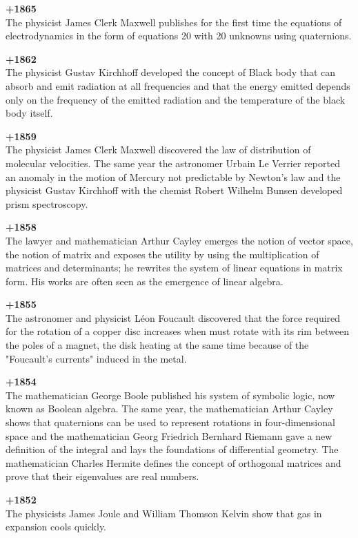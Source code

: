 \textbf{+1865}\\
The physicist James Clerk Maxwell publishes for the first time the equations of electrodynamics in the form of equations 20 with 20 unknowns using quaternions. 

\textbf{+1862}\\
The physicist Gustav Kirchhoff developed the concept of Black body that can absorb and emit radiation at all frequencies and that the energy emitted depends only on the frequency of the emitted radiation and the temperature of the black body itself.

\textbf{+1859}\\
The physicist James Clerk Maxwell discovered the law of distribution of molecular velocities. The same year the astronomer Urbain Le Verrier reported an anomaly in the motion of Mercury not predictable by Newton's law and the physicist Gustav Kirchhoff with the chemist Robert Wilhelm Bunsen developed prism spectroscopy. 

\textbf{+1858}\\
The lawyer and mathematician Arthur Cayley emerges the notion of vector space, the notion of matrix and exposes the utility by using the multiplication of matrices and determinants; he rewrites the system of linear equations in matrix form. His works are often seen as the emergence of linear algebra.

\textbf{+1855}\\
The astronomer and physicist Léon Foucault discovered that the force required for the rotation of a copper disc increases when must rotate with its rim between the poles of a magnet, the disk heating at the same time because of the "Foucault's currents" induced in the metal. 

\textbf{+1854}\\
The mathematician George Boole published his system of symbolic logic, now known as Boolean algebra. The same year, the mathematician Arthur Cayley shows that quaternions can be used to represent rotations in four-dimensional space and the mathematician Georg Friedrich Bernhard Riemann gave a new definition of the integral and lays the foundations of differential geometry.  The mathematician Charles Hermite defines the concept of orthogonal matrices and prove that their eigenvalues are real numbers.

\textbf{+1852}\\
The physicists James Joule and William Thomson Kelvin show that gas in expansion cools quickly.


